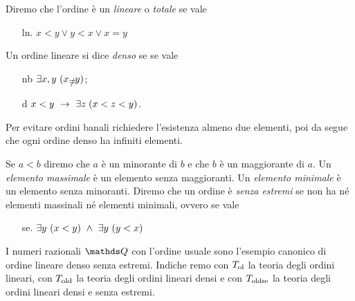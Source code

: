 Diremo che l'ordine \`e un \emph{lineare\/} o \emph{totale\/} se vale

\begin{itemize}
\item[ln.] $x< y \vee y< x \vee x=y$
\end{itemize}

Un ordine lineare si dice \emph{denso\/} se se vale

\begin{itemize}
\item[nb]  $\E x,y\ (x\neq y)$;
\item[d] $x<y\ \rightarrow\ \exists z\;(x<z<y)$.
\end{itemize}

Per evitare ordini banali  richiedere l'esistenza almeno due elementi, poi da  segue che ogni ordine denso ha infiniti elementi.

Se $a<b$ diremo che $a$ \`e un minorante di $b$ e che $b$ \`e un maggiorante di $a$. Un \emph{elemento massimale\/} \`e un elemento senza maggioranti. Un \emph{elemento minimale\/} \`e un elemento senza minoranti. Diremo che un ordine \`e  \emph{senza estremi\/} se non ha n\'e elementi massinali n\'e elementi minimali, ovvero se vale

\begin{itemize}
\item[se.] $\exists y\ (x<y)\ \wedge\ \exists y\ (y<x)$
\end{itemize}

I numeri razionali $\QQ$ con l'ordine usuale sono l'esempio canonico di ordine lineare denso senza estremi. Indiche remo con \emph{$T_{\rm ol}$} la teoria degli ordini lineari, con \emph{$T_{\rm old}$} la teoria degli ordini lineari densi e con \emph{$T_{\rm oldse}$} la teoria degli ordini lineari densi e senza estremi.

% 


% 
% 

